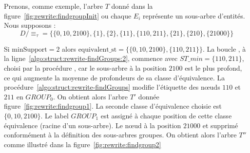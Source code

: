 \begin{example}
    Prenons, comme exemple, l'arbre $T$ donné dans la figure~\ref{fig:rewrite:findgroupInit} ou chaque $E_i$ représente un sous-arbre d'entités.
    Nous supposons :
    \[
        D/\equiv_\tau = \{\{0, 10, 2100\}, \{1\}, \{2\}, \{11\}, \{110, 211\} , \{21\} , \{210\} , \{21000\} \}
    \]

    Si $\text{minSupport} = 2$ alors $\text{equivalent\_st} = \{\{0, 10, 2100\}, \{110, 211\}\}$.
    La boucle , à la ligne~\ref{algo:struct:rewrite-findGroups:2}, commence avec $ST\_min = \{110, 211\}$, choisi par la procédure \findSTwithMinLeavesTree, car le sous-arbre à la position $2100$ est le plus profond, ce qui augmente la moyenne de profondeurs de sa classe d'équivalence.
    La procédure~\ref{algo:struct:rewrite-findGroups} modifie l'étiquette des nœuds $110$ et $211$ en $GROUP_0$.
    On obtient alors l'arbre $T'$ donnée figure~\ref{fig:rewrite:findgroup1}.
    La seconde classe d'équivalence choisie est $\{0, 10, 2100\}$.
    Le label $GROUP_1$ est assigné à chaque position de cette classe équivalence (racine d'un sous-arbre).
    Le nœud à la position $21000$ et supprimé conformément à la définition des sous-arbres groupes.
    On obtient alors l'arbre $T''$ comme illustré dans la figure~\ref{fig:rewrite:findgroup2}
\end{example}

